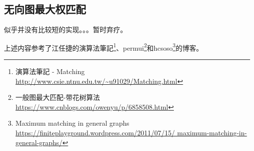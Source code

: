 \subsection{无向图最大权匹配}
似乎并没有比较短的实现。。。暂时弃疗。


上述内容参考了江任捷的演算法筆記\footnote{
    演算法筆記 - Matching
    \url{http://www.csie.ntnu.edu.tw/\~u91029/Matching.html}
}、permui\footnote{
    一般图最大匹配-带花树算法
    \url{https://www.cnblogs.com/owenyu/p/6858508.html}
}和hcsoso\footnote{
    Maximum matching in general graphs
    \url{https://finiteplayground.wordpress.com/2011/07/15/
    maximum-matching-in-general-graphs/}
}的博客。
